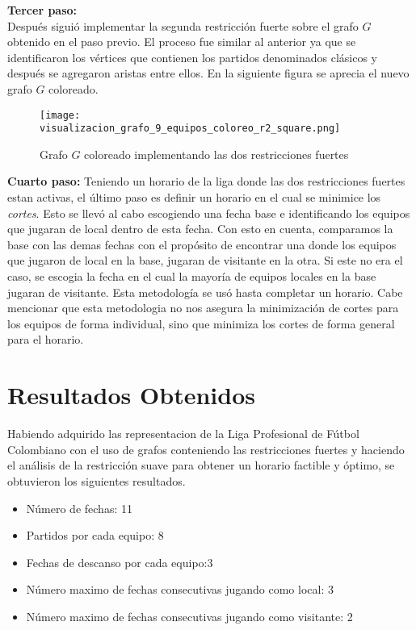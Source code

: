 \documentclass[11pt]{article}
\begin{document}
\begin{multicols}{2}
            \textbf{Tercer paso:}\\ 
            Después siguió implementar la segunda restricción fuerte sobre el grafo $G$ obtenido en el paso previo.
            El proceso fue similar al anterior ya que se identificaron los vértices que contienen los 
            partidos denominados clásicos y después se agregaron aristas entre ellos. En la siguiente figura se aprecia el nuevo grafo $G$ coloreado.
            \begin{figure}[H]
                \begin{center}
                    \texttt{[image: visualizacion\_grafo\_9\_equipos\_coloreo\_r2\_square.png]}  
                \caption{Grafo $G$ coloreado implementando las dos restricciones fuertes}
                \end{center}
            \end{figure}
            \textbf{Cuarto paso:}
            Teniendo un horario de la liga donde las dos restricciones fuertes estan activas, el último paso es definir un horario en el cual se minimice los \textit{cortes}.
            Esto se llevó al cabo escogiendo una fecha base e identificando los equipos que jugaran de local dentro de esta fecha. Con esto en cuenta, comparamos 
            la base con las demas fechas con el propósito de encontrar una donde los equipos que jugaron de local en la base, jugaran de visitante en la otra.
            Si este no era el caso, se escogia la fecha en el cual la mayoría de equipos locales en la base jugaran de visitante. Esta metodología se usó hasta completar un horario.   
            Cabe mencionar que esta metodologia no nos asegura la minimización de cortes para los equipos de forma individual, sino que minimiza los cortes de forma general para el horario. 

        \section{Resultados Obtenidos}
            Habiendo adquirido las representacion de la Liga Profesional de Fútbol Colombiano con el uso de grafos conteniendo las restricciones fuertes y haciendo el análisis de la 
            restricción suave para obtener un horario factible y óptimo, se obtuvieron los siguientes resultados.
            \begin{itemize}
                \item Número de fechas: 11
                \item Partidos por cada equipo: 8
                \item Fechas de descanso por cada equipo:3
                \item Número maximo de fechas consecutivas jugando como local: 3
                \item Número maximo de fechas consecutivas jugando como visitante: 2
            \end{itemize}


\end{multicols}
\end{document}
